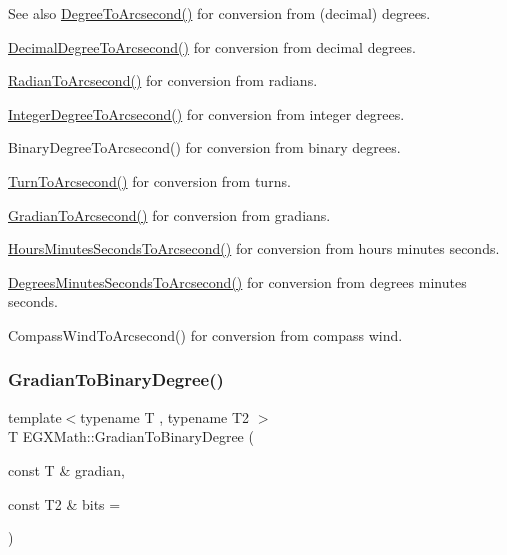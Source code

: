 \begin{DoxySeeAlso}{See also}
\mbox{\hyperlink{group___e_g_x_math-_conversions-_angle_conversions-_degree_gaf85e2d765c248f447854a807a68a5de8}{Degree\+To\+Arcsecond()}} for conversion from (decimal) degrees. 

\mbox{\hyperlink{group___e_g_x_math-_conversions-_angle_conversions-_decimal_degree_gab9d5635a6e35127b5245978aba508962}{Decimal\+Degree\+To\+Arcsecond()}} for conversion from decimal degrees. 

\mbox{\hyperlink{group___e_g_x_math-_conversions-_angle_conversions-_radian_ga2f952f6675a0fc54bf72bfe4e3d2664a}{Radian\+To\+Arcsecond()}} for conversion from radians. 

\mbox{\hyperlink{group___e_g_x_math-_conversions-_angle_conversions-_integer_degree_gaa04058a2fea3dc3678264a05fac6e1ae}{Integer\+Degree\+To\+Arcsecond()}} for conversion from integer degrees. 

Binary\+Degree\+To\+Arcsecond() for conversion from binary degrees. 

\mbox{\hyperlink{group___e_g_x_math-_conversions-_angle_conversions-_turn_gaad072969abc59ef6f5b63ac6a176a11b}{Turn\+To\+Arcsecond()}} for conversion from turns. 

\mbox{\hyperlink{group___e_g_x_math-_conversions-_angle_conversions-_gradian_gac768fd444195264165d332f2f5e84d92}{Gradian\+To\+Arcsecond()}} for conversion from gradians. 

\mbox{\hyperlink{group___e_g_x_math-_conversions-_angle_conversions-_hours_minutes_seconds_ga14620899c81c1f5e65cde96ef4ee626e}{Hours\+Minutes\+Seconds\+To\+Arcsecond()}} for conversion from hours minutes seconds. 

\mbox{\hyperlink{group___e_g_x_math-_conversions-_angle_conversions-_degrees_minutes_seconds_gabebc8a012be0442c12409a2a71661ed4}{Degrees\+Minutes\+Seconds\+To\+Arcsecond()}} for conversion from degrees minutes seconds. 

Compass\+Wind\+To\+Arcsecond() for conversion from compass wind. 
\end{DoxySeeAlso}
\mbox{\label{group___e_g_x_math-_conversions-_angle_conversions-_gradian_ga6bf31920148bfd61f1f06eb961c3f62b}} 
\subsubsection{\texorpdfstring{Gradian\+To\+Binary\+Degree()}{GradianToBinaryDegree()}}
{\footnotesize\ttfamily template$<$typename T , typename T2 $>$ \\
T E\+G\+X\+Math\+::\+Gradian\+To\+Binary\+Degree (\begin{DoxyParamCaption}\item[{const T \&}]{gradian,  }\item[{const T2 \&}]{bits = {} }\end{DoxyParamCaption})}



